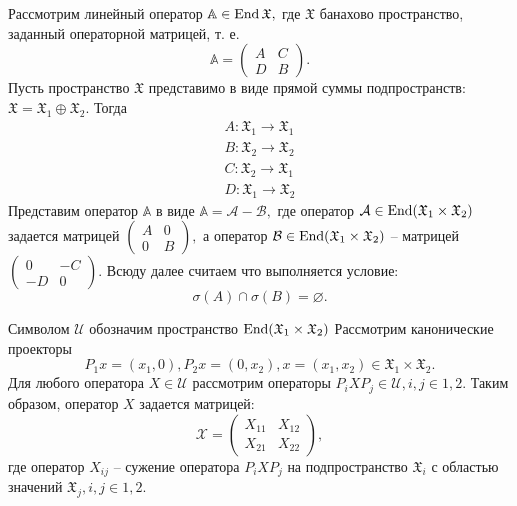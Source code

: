 Рассмотрим линейный оператор $\mathbb{A} \in \operatorname{End}\mathfrak{X},$
где $\mathfrak{X}$ банахово пространство, заданный операторной матрицей, т. \! е.
$$
\mathbb{A} = \begin{pmatrix}
		A & C \\
		D & B
	\end{pmatrix}.
$$
Пусть пространство $\mathfrak{X}$ представимо в виде прямой суммы подпространств: $\mathfrak{X} = \mathfrak{X}_1 \oplus \mathfrak{X}_2.$ Тогда
\begin{align*}
A \colon \mathfrak{X}_1 \to \mathfrak{X}_1 \\
B \colon \mathfrak{X}_2 \to \mathfrak{X}_2 \\
C \colon \mathfrak{X}_2 \to \mathfrak{X}_1 \\
D \colon \mathfrak{X}_1 \to \mathfrak{X}_2
\end{align*}
Представим оператор $\mathbb{A}$ в виде $\mathbb{A} = \mathcal{A} - \mathcal{B},$ где оператор $\mathcal{A} \in \operatorname{End}(\mathfrak{X}_1 \times \mathfrak{X}_2)$ задается матрицей 
$\begin{pmatrix}
		A & 0 \\
		0 & B
\end{pmatrix}, $ а оператор $\mathcal{B} \in \operatorname{End}(\mathfrak{X}_1 \times \mathfrak{X}_2)$ -- матрицей
$\begin{pmatrix}
		0 & -C \\
		-D & 0
\end{pmatrix}.$
Всюду далее считаем что выполняется условие:
$$
\sigma(A) \cap \sigma(B) = {\varnothing}.
$$

Символом $\mathcal{U}$ обозначим пространство $\operatorname{End}(\mathfrak{X}_1 \times \mathfrak{X}_2)$ Рассмотрим канонические проекторы
$$
P_1x = (x_1, 0), P_2x = (0, x_2), x = (x_1, x_2) \in \mathfrak{X}_1 \times \mathfrak{X}_2.
$$
Для любого оператора $X \in \mathcal{U}$ рассмотрим операторы $P_iXP_j \in \mathcal{U}, i,j \in {1,2}.$ Таким образом, оператор $X$ задается матрицей:
$$
\mathcal{X} = \begin{pmatrix}
		X_{11} & X_{12} \\
		X_{21} & X_{22}
	\end{pmatrix},
$$
где оператор $X_{ij}$ -- сужение оператора $P_iXP_j$ на подпространство $\mathfrak{X}_i$ с областью значений $\mathfrak{X}_j, i,j \in {1,2}.$

